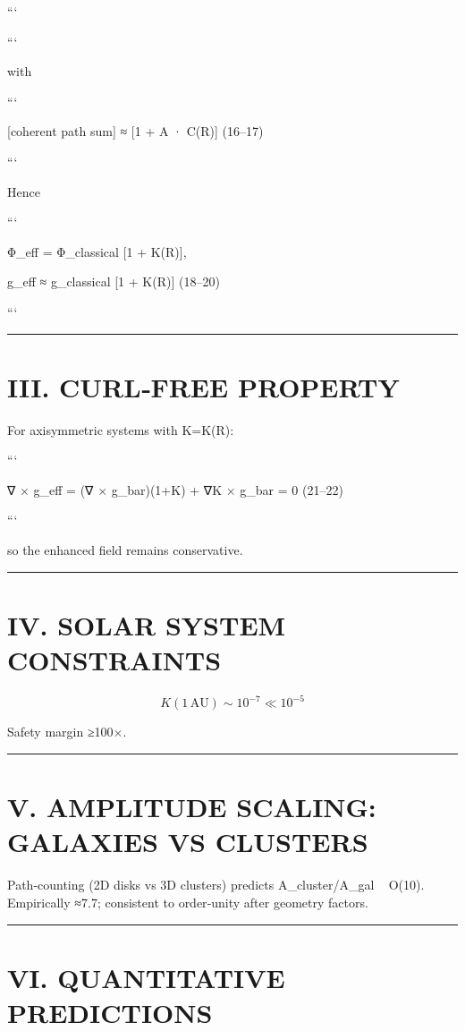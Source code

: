 \documentclass[11pt,a4paper]{article}
\begin{document}
```

```

with

```

[coherent path sum] ≈ [1 + A · C(R)]     (16–17)

```

Hence

```

Φ\_eff = Φ\_classical [1 + K(R)],

 g\_eff ≈ g\_classical [1 + K(R)]     (18–20)

```


\medskip\hrule\medskip


\section{III. CURL‑FREE PROPERTY}


For axisymmetric systems with K=K(R):

```

∇ × g\_eff = (∇ × g\_bar)(1+K) + ∇K × g\_bar = 0     (21–22)

```

so the enhanced field remains conservative.


\medskip\hrule\medskip


\section{IV. SOLAR SYSTEM CONSTRAINTS}


\begin{equation}
K(1\,\mathrm{AU}) \sim 10^{-7} \ll 10^{-5}
\end{equation}

Safety margin ≥100×.


\medskip\hrule\medskip


\section{V. AMPLITUDE SCALING: GALAXIES VS CLUSTERS}


Path‑counting (2D disks vs 3D clusters) predicts A\_cluster/A\_gal ~ O(10). Empirically ≈7.7; consistent to order‑unity after geometry factors.


\medskip\hrule\medskip


\section{VI. QUANTITATIVE PREDICTIONS}
\end{document}
